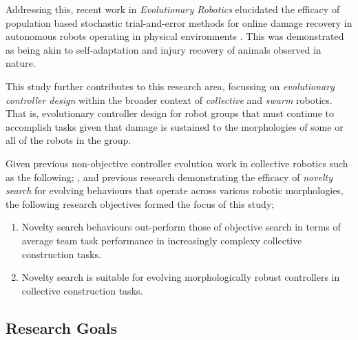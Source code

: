 
Addressing this, recent work in \textit{Evolutionary Robotics} elucidated the efficacy of population based stochastic trial-and-error methods for online damage recovery in autonomous robots operating in physical environments \cite{CullyCluneTaraporeMouret2015}.
This was demonstrated as being akin to self-adaptation and injury recovery of animals observed in nature.

This study further contributes to this research area, focussing on \textit{evolutionary controller design} \cite{FloreanoDurrMattiussi2008} within the broader context of \textit{collective} \cite{KubeZhang1994B} and \textit{swarm} \cite{Beni2004} robotics.
That is, evolutionary controller design for robot groups that must continue to accomplish tasks given that damage is sustained to the morphologies of some or all of the robots in the group.



Given previous non-objective controller evolution work in collective robotics such as the following;
\cite{gomes2013generic}
\cite{RefWorks:5}
\cite{RefWorks:11},
and previous research demonstrating the efficacy of \textit{novelty search} \cite{lehman2011abandoning} for evolving behaviours that operate across various robotic morphologies, the following research objectives formed the focus of this study;

\begin{enumerate}
	\item Novelty search behaviours out-perform those of objective search in terms of average team task performance in increasingly complexy collective construction tasks.
	\item Novelty search is suitable for evolving morphologically robust controllers in collective construction tasks.
\end{enumerate}




\subsection{Research Goals}

